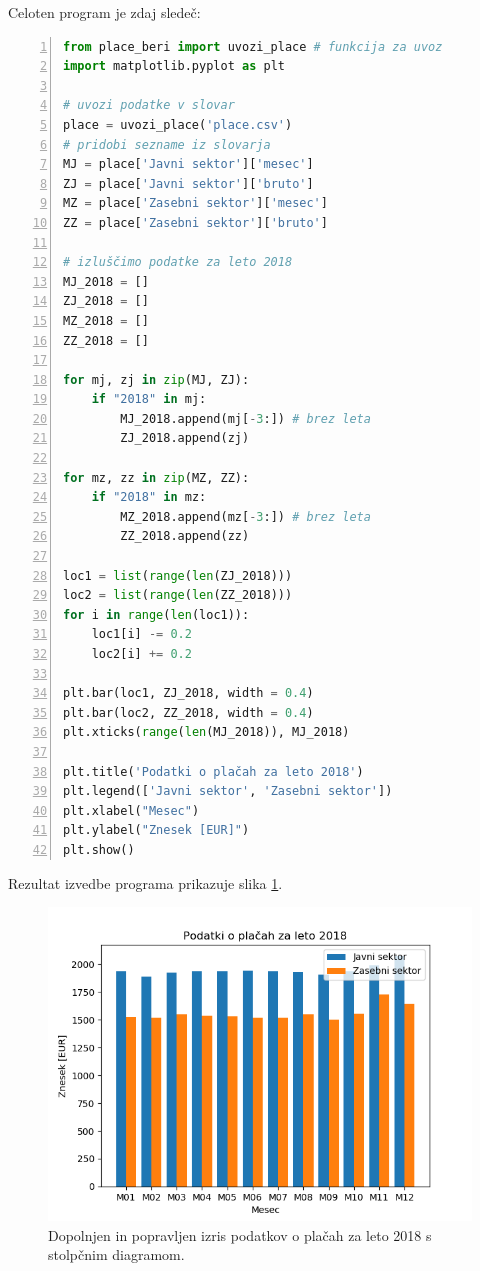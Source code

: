 Celoten program je zdaj sledeč:
\begin{lstlisting}[language=Python,numbers=left]
from place_beri import uvozi_place # funkcija za uvoz
import matplotlib.pyplot as plt

# uvozi podatke v slovar
place = uvozi_place('place.csv')
# pridobi sezname iz slovarja
MJ = place['Javni sektor']['mesec']
ZJ = place['Javni sektor']['bruto']
MZ = place['Zasebni sektor']['mesec']
ZZ = place['Zasebni sektor']['bruto']

# izluščimo podatke za leto 2018
MJ_2018 = []
ZJ_2018 = []
MZ_2018 = []
ZZ_2018 = []

for mj, zj in zip(MJ, ZJ):
    if "2018" in mj:
        MJ_2018.append(mj[-3:]) # brez leta
        ZJ_2018.append(zj)

for mz, zz in zip(MZ, ZZ):
    if "2018" in mz:
        MZ_2018.append(mz[-3:]) # brez leta
        ZZ_2018.append(zz)

loc1 = list(range(len(ZJ_2018)))
loc2 = list(range(len(ZZ_2018)))
for i in range(len(loc1)):
    loc1[i] -= 0.2
    loc2[i] += 0.2

plt.bar(loc1, ZJ_2018, width = 0.4)
plt.bar(loc2, ZZ_2018, width = 0.4)
plt.xticks(range(len(MJ_2018)), MJ_2018)

plt.title('Podatki o plačah za leto 2018')
plt.legend(['Javni sektor', 'Zasebni sektor'])
plt.xlabel("Mesec")
plt.ylabel("Znesek [EUR]")
plt.show()
\end{lstlisting}
Rezultat izvedbe programa prikazuje slika \ref{img:plt7}.
\begin{figure}
    \includegraphics[width=\linewidth]{img/plt7.png}
    \caption{Dopolnjen in popravljen izris podatkov o plačah za leto 2018 s stolpčnim diagramom.}
    \label{img:plt7}
\end{figure}

